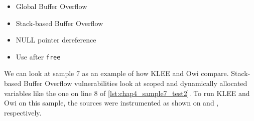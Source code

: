 
\begin{itemize}
    \item Global Buffer Overflow
    \item Stack-based Buffer Overflow
    \item NULL pointer dereference
    \item Use after \lstinline$free$
\end{itemize}

We can look at sample 7 as an example of how KLEE and Owi compare. Stack-based Buffer Overflow vulnerabilities look at scoped and dynamically allocated variables like the one on line 8 of \cref{lst:chap4_sample7_test2}. To run KLEE and Owi on this sample, the sources were instrumented as shown on  and , respectively.





